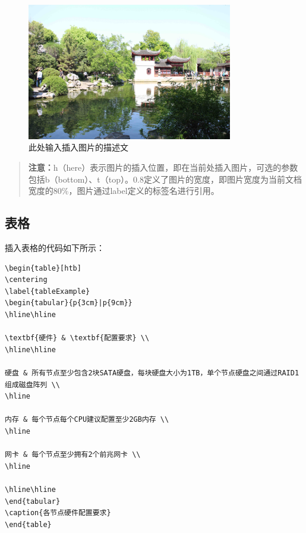 \begin{figure}[h]
    \centering
    \label{example}
    \includegraphics[width=0.8\textwidth]{pic/example.jpg}
    \caption{此处输入插入图片的描述文}
\end{figure}

\begin{quote}
\kaishu
\textbf{注意：}h（here）表示图片的插入位置，即在当前处插入图片，可选的参数包括b（bottom）、t（top）。0.8定义了图片的宽度，即图片宽度为当前文档宽度的80\%，图片通过label定义的标签名进行引用。
\end{quote}

\subsection{表格}
插入表格的代码如下所示：

\begin{Verbatim}[]
\begin{table}[htb]
\centering
\label{tableExample}
\begin{tabular}{p{3cm}|p{9cm}}
\hline\hline

\textbf{硬件} & \textbf{配置要求} \\
\hline\hline

硬盘 & 所有节点至少包含2块SATA硬盘，每块硬盘大小为1TB，单个节点硬盘之间通过RAID1组成磁盘阵列 \\
\hline

内存 & 每个节点每个CPU建议配置至少2GB内存 \\
\hline

网卡 & 每个节点至少拥有2个前兆网卡 \\
\hline

\hline\hline
\end{tabular}
\caption{各节点硬件配置要求}
\end{table}
\end{Verbatim}



